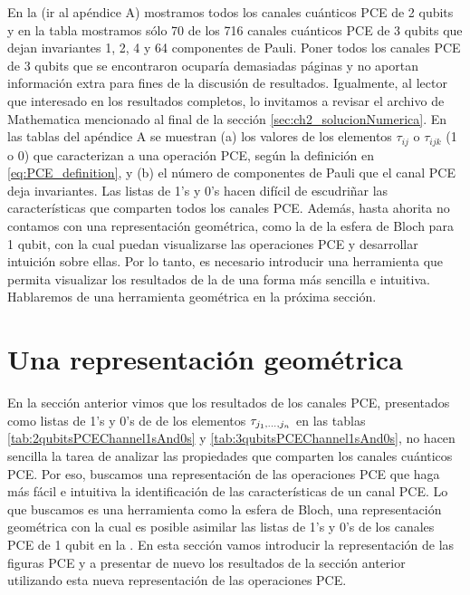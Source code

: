 En la  (ir al apéndice A) mostramos
todos los canales cuánticos PCE de 2 qubits y en la tabla 
 mostramos sólo 
70 de los 716 canales cuánticos PCE de 3 qubits que dejan invariantes 
1, 2, 4 y 64 componentes de Pauli. Poner todos los canales PCE de 3 
qubits que se encontraron ocuparía demasiadas páginas y no aportan 
información extra para fines de la discusión de resultados.
Igualmente, al lector que interesado en los resultados completos,
lo invitamos a revisar el archivo de Mathematica mencionado 
al final de la sección \ref{sec:ch2_solucionNumerica}. 
En las tablas del apéndice A se muestran
(a) los valores de los elementos $\tau_{ij}$ o $\tau_{ijk}$ (1 o 0) que caracterizan 
a una operación PCE, según la definición en \eqref{eq:PCE_definition},
y (b) el número de componentes de Pauli que el canal PCE
deja invariantes. Las listas de 1's y 0's hacen difícil de escudriñar
las características que comparten todos los canales PCE.
Además, hasta ahorita no contamos con una representación geométrica, 
como la de la esfera de Bloch para 1 qubit, con la cual puedan visualizarse 
las operaciones PCE y desarrollar intuición sobre ellas.
Por lo tanto, es necesario introducir una herramienta
que permita visualizar los resultados de la 
de una forma más sencilla e intuitiva. Hablaremos de una herramienta geométrica
en la próxima sección.


\section{Una representación geométrica}\label{sec:ch3_geometric_representation} %

En la sección anterior vimos que los resultados de los canales PCE,
presentados como listas de 1's y 0's 
de de los elementos $\tau_{j_1,\ldots ,j_n}$ en las tablas \ref{tab:2qubitsPCEChannel1sAnd0s} y 
\ref{tab:3qubitsPCEChannel1sAnd0s}, no hacen sencilla la tarea de analizar 
las propiedades que comparten los canales cuánticos PCE. Por eso, 
buscamos una representación de las operaciones PCE que haga más fácil 
e intuitiva la identificación de las características de un canal PCE. 
Lo que buscamos es una herramienta como la esfera de Bloch, 
una representación geométrica con la cual es posible asimilar las listas 
de 1's y 0's de los canales PCE de 1 qubit en la .  
En esta sección vamos introducir la representación de las figuras PCE 
y a presentar de nuevo los resultados de la sección anterior 
utilizando esta nueva representación de las operaciones PCE.


